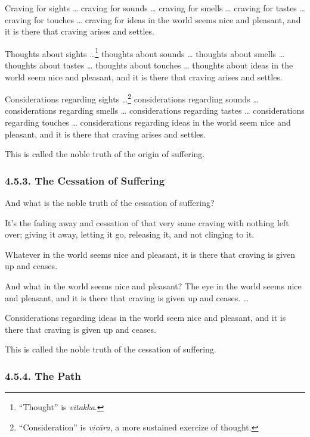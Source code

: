 \documentclass[12pt,openany]{book}%
\begin{document}
Craving for sights … craving for sounds … craving for smells … craving for tastes … craving for touches … craving for ideas in the world seems nice and pleasant, and it is there that craving arises and settles. 

Thoughts about sights …\footnote{“Thought” is \textit{vitakka}. } thoughts about sounds … thoughts about smells … thoughts about tastes … thoughts about touches … thoughts about ideas in the world seem nice and pleasant, and it is there that craving arises and settles. 

Considerations regarding sights …\footnote{“Consideration” is \textit{\textsanskrit{vicāra}}, a more sustained exercize of thought. } considerations regarding sounds … considerations regarding smells … considerations regarding tastes … considerations regarding touches … considerations regarding ideas in the world seem nice and pleasant, and it is there that craving arises and settles. 

This is called the noble truth of the origin of suffering. 

\subsubsection*{4.5.3. The Cessation of Suffering }

And what is the noble truth of the cessation of suffering? 

It’s the fading away and cessation of that very same craving with nothing left over; giving it away, letting it go, releasing it, and not clinging to it. 

Whatever in the world seems nice and pleasant, it is there that craving is given up and ceases. 

And what in the world seems nice and pleasant? The eye in the world seems nice and pleasant, and it is there that craving is given up and ceases. … 

Considerations regarding ideas in the world seem nice and pleasant, and it is there that craving is given up and ceases. 

This is called the noble truth of the cessation of suffering. 

\subsubsection*{4.5.4. The Path }
\end{document}
